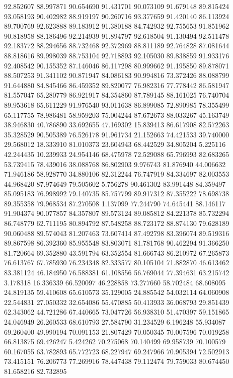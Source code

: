 92.852607
88.997871
90.654690
91.431701
90.073109
91.679148
89.815424
93.058193
90.402982
88.919197
90.260716
93.377659
91.420140
86.113924
89.700769
92.623888
89.183912
91.380188
84.742932
92.755653
91.851962
90.818958
88.186496
92.214939
91.894797
92.618504
91.130494
92.511478
92.183772
88.294656
88.732468
92.372969
88.811189
92.764828
87.081644
88.818616
89.998039
88.753104
92.718893
92.105030
89.838859
91.933176
92.408542
90.155352
87.146046
86.117298
80.999662
91.195850
89.878071
88.507253
91.341102
90.871947
84.086183
90.994816
73.372426
88.088799
91.644880
84.845466
86.459352
89.820077
76.982316
77.778442
86.581947
81.557047
65.280779
86.921917
84.354860
87.789145
88.161025
76.740704
89.953618
65.611229
91.976540
93.011638
86.899085
72.890985
78.355499
65.117755
78.986481
58.959203
75.004244
87.672673
88.033267
45.163749
38.946830
40.786890
33.692655
47.169302
15.839413
86.617908
82.572263
35.328529
90.505389
76.526178
91.961734
21.152663
74.421533
39.740000
29.568012
18.333910
81.010373
23.604943
68.442529
34.805204
5.225116
42.244435
10.239933
24.954146
68.475978
72.529088
65.796993
82.683265
53.739415
78.439016
38.088768
86.802903
9.976743
81.876940
44.006632
71.946186
58.928770
34.880106
82.312244
76.747919
84.334697
82.003553
44.968420
87.974649
79.505602
5.756278
90.461302
83.991448
84.359497
85.095183
76.998992
79.140735
85.757799
89.917312
87.355222
78.698738
89.355358
79.968534
87.270508
1.137099
77.244790
74.645441
88.146117
91.904374
90.077857
84.357807
89.573124
89.085812
84.221378
85.732294
86.748779
62.711195
80.894792
87.548258
88.723172
88.874130
79.628189
90.060488
89.574043
81.207463
73.607414
87.492798
83.396074
89.519316
89.867598
86.392360
85.955548
83.803071
81.781768
90.462294
91.366250
81.720664
69.352880
43.591794
63.352554
81.666743
86.210972
67.265873
76.613767
67.785930
76.234348
82.333577
80.105104
71.882870
46.613462
83.381124
46.184950
76.588381
61.108556
56.769044
77.394631
63.215742
3.178318
16.336339
66.520097
46.228858
73.277660
58.702484
68.608095
24.819135
59.410608
65.610573
35.129005
24.885542
54.032114
64.060908
22.544831
27.050332
32.654086
55.470885
50.413933
36.068793
29.851439
62.343062
44.721286
67.440665
73.047726
56.938310
51.470397
59.151865
24.046949
26.260533
68.610793
27.584790
31.234529
6.196248
55.934087
69.260400
49.990194
70.091153
21.807429
70.050345
70.007596
70.019258
66.813875
69.426247
5.424262
70.275068
70.140499
69.958739
70.100579
60.167055
63.782893
65.772723
68.227947
69.247966
70.905394
72.502913
73.415151
76.206773
77.269916
78.447438
79.112474
79.759033
80.674450
81.658216
82.732895
